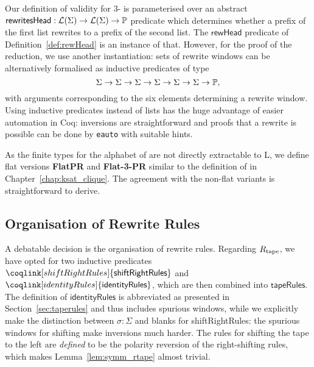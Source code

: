 Our definition of validity for 3-\PR{} is parameterised over an abstract $\textsf{rewritesHead} : \mathcal{L} (\Sigma) \rightarrow \mathcal{L} (\Sigma) \rightarrow \mathbb{P}$ predicate which determines whether a prefix of the first list rewrites to a prefix of the second list. The $\textsf{rewHead}$ predicate of Definition~\ref{def:rewHead} is an instance of that.
However, for the proof of the reduction, we use another instantiation: sets of rewrite windows can be alternatively formalised as inductive predicates of type
\[ \Sigma \rightarrow \Sigma \rightarrow \Sigma \rightarrow \Sigma \rightarrow \Sigma \rightarrow \Sigma \rightarrow \mathbb{P}, \]
with arguments corresponding to the six elements determining a rewrite window. 
Using inductive predicates instead of lists has the huge advantage of easier automation in Coq: inversions are straightforward and proofs that a rewrite is possible can be done by \texttt{eauto} with suitable hints.

As  the finite types for the alphabet of \PR{} are not directly extractable to L, we define flat versions \textbf{FlatPR} and \textbf{Flat-3-PR} similar 
to the definition of \FlatClique{} in Chapter~\ref{chap:ksat_clique}.
The agreement with the non-flat variants is straightforward to derive.

\subsection{Organisation of Rewrite Rules}
A debatable decision is the organisation of rewrite rules. Regarding $R_{\text{tape}}$, we have opted for two inductive predicates $\coqlink[shiftRightRules]{\textsf{shiftRightRules}}$ and $\coqlink[identityRules]{\textsf{identityRules}}$, which are then combined into $\textsf{tapeRules}$. The definition of $\textsf{identityRules}$ is abbreviated as presented in Section~\ref{sec:taperules} and thus includes spurious windows, while we explicitly make the distinction between $\sigma : \Sigma$ and blanks for \textsf{shiftRightRules}: the spurious windows for shifting make inversions much harder. 
The rules for shifting the tape to the left are \emph{defined} to be the polarity reversion of the right-shifting rules, which makes Lemma~\ref{lem:symm_rtape} almost trivial.


